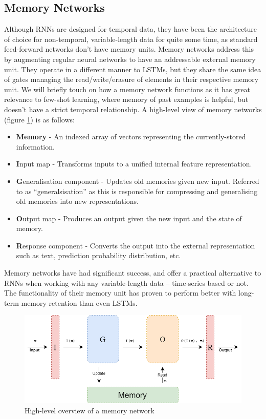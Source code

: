 \documentclass{report}
\begin{document}
\subsection{Memory Networks}\label{memory-nets:1}
Although RNNs are designed for temporal data, they have been the architecture of choice for non-temporal, variable-length data for quite some time, as standard feed-forward networks don't have memory units. Memory networks address this by augmenting regular neural networks to have an addressable external memory unit. They operate in a different manner to LSTMs, but they share the same idea of gates managing the read/write/erasure of elements in their respective memory unit. We will briefly touch on how a memory network functions as it has great relevance to few-shot learning, where memory of past examples is helpful, but doesn't have a strict temporal relationship. A high-level view of memory networks (figure \ref{fig:memory-nets:1}) is as follows:
\begin{itemize}
 \item \textbf{Memory} - An indexed array of vectors representing the currently-stored information.
 \item \textbf{I}nput map - Transforms inputs to a unified internal feature representation.
 \item \textbf{G}eneralisation component - Updates old memories given new input. Referred to as ``generalsisation'' as this is responsible for compressing and generalising old memories into new representations.
 \item \textbf{O}utput map - Produces an output given the new input and the state of memory.
 \item \textbf{R}esponse component - Converts the output into the external representation such as text, prediction probability distribution, etc.
\end{itemize}
Memory networks have had significant success, and offer a practical alternative to RNNs when working with any variable-length data -- time-series based or not. The functionality of their memory unit has proven to perform better with long-term memory retention than even LSTMs. \par
\begin{figure}[h]
 \centering
 \includegraphics[width=14cm]{memory-nets}
 \caption{High-level overview of a memory network}
 \label{fig:memory-nets:1}
\end{figure}
\end{document}
